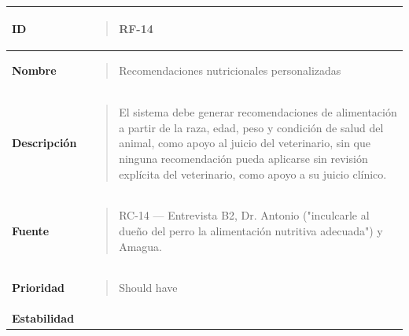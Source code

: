 \documentclass[
]{article}
\newcounter{none} %
\begin{document}
{\def\LTcaptype{none} %
\begin{longtable}[]{@{}
  >{\raggedright\arraybackslash}p{}
  >{\raggedright\arraybackslash}p{}@{}}
\toprule\noalign{}
\begin{minipage}[b]{\linewidth}\raggedright
\textbf{ID}
\end{minipage} & \begin{minipage}[b]{\linewidth}\raggedright
\begin{quote}
RF-14
\end{quote}
\end{minipage} \\
\midrule\noalign{}
\endhead
\bottomrule\noalign{}
\endlastfoot
\textbf{Nombre} & \begin{minipage}[t]{\linewidth}\raggedright
\begin{quote}
Recomendaciones nutricionales personalizadas
\end{quote}
\end{minipage} \\
\textbf{Descripción} & \begin{minipage}[t]{\linewidth}\raggedright
\begin{quote}
El sistema debe generar recomendaciones de alimentación a partir de la
raza, edad, peso y condición de salud del animal, como apoyo al juicio
del veterinario, sin que ninguna recomendación pueda aplicarse sin
revisión explícita del veterinario, como apoyo a su juicio clínico.
\end{quote}
\end{minipage} \\
\textbf{Fuente} & \begin{minipage}[t]{\linewidth}\raggedright
\begin{quote}
RC-14 --- Entrevista B2, Dr. Antonio ("inculcarle al dueño del perro la
alimentación nutritiva adecuada") y Amagua.
\end{quote}
\end{minipage} \\
\textbf{Prioridad} & \begin{minipage}[t]{\linewidth}\raggedright
\begin{quote}
Should have
\end{quote}
\end{minipage} \\
\textbf{Estabilidad} & \begin{minipage}[t]{\linewidth}\raggedright
\begin{quote}

\end{quote}
\end{minipage}
\end{longtable}}
\end{document}

